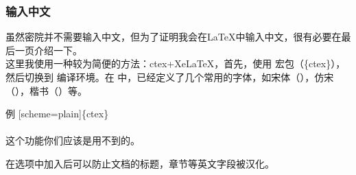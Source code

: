 \begin{frame}
	\songti
	\frametitle{输入中文}
	\qquad 虽然密院并不需要输入中文，但为了证明我会在\LaTeX 中输入中文，很有必要在最后一页介绍一下。\\
	\qquad 这里我使用一种较为简便的方法：ctex+XeLaTeX，首先，使用  宏包（\{ctex\}），然后切换到  编译环境。在  中，已经定义了几个常用的字体，如宋体（），仿宋（），楷书（）等。
	\begin{exampleblock}{例}
		[scheme=plain]\{ctex\}\\
		\\
		这个功能你们应该是用不到的。
	\end{exampleblock}
	\qquad 在选项中加入\structure{[scheme=plain]}后可以防止文档的标题，章节等英文字段被汉化。
\end{frame}
